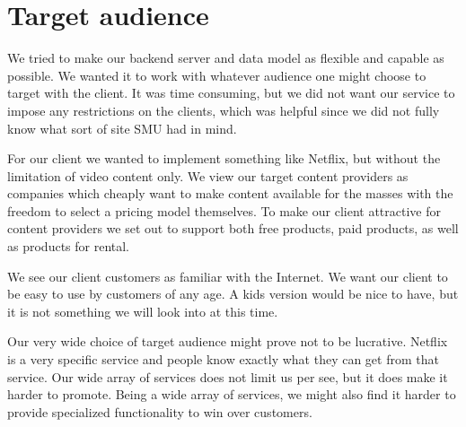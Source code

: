 \section{Target audience}
We tried to make our backend server and data model as flexible and capable as possible. We wanted it to work with whatever audience one might choose to target with the client. It was time consuming, but we did not want our service to impose any restrictions on the clients, which was helpful since we did not fully know what sort of site SMU had in mind.

For our client we wanted to implement something like Netflix, but without the limitation of video content only. 
We view our target content providers as companies which cheaply want to make content available for the masses with the freedom to select a pricing model themselves.
To make our client attractive for content providers we set out to support both free products, paid products, as well as products for rental.

We see our client customers as familiar with the Internet. We want our client to be easy to use by customers of any age. A kids version would be nice to have, but it is not something we will look into at this time.

Our very wide choice of target audience might prove not to be lucrative. Netflix is a very specific service and people know exactly what they can get from that service. Our wide array of services does not limit us per see, but it does make it harder to promote. Being a wide array of services, we might also find it harder to provide specialized functionality to win over customers.
\newpage